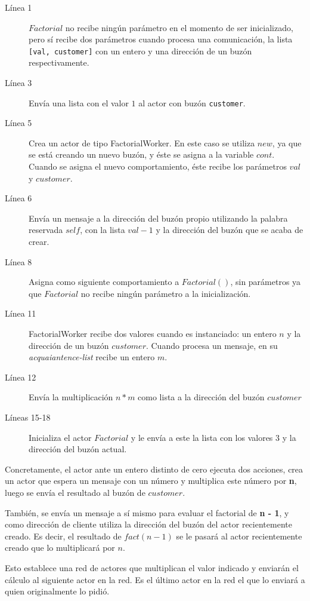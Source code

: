 \begin{description}

\item [Línea 1] $Factorial$ no recibe ningún parámetro en el momento de ser inicializado, pero sí recibe dos parámetros cuando procesa una comunicación, la lista \lstinline[language=sal, style=simple]$[val, customer]$ con un entero y una dirección de un buzón respectivamente.
\item [Línea 3] Envía una lista con el valor $1$ al actor con buzón \lstinline[language=sal, style=simple]$customer$.
\item [Línea 5] Crea un actor de tipo FactorialWorker. En este caso se utiliza $new$, ya que se está creando un nuevo buzón, y éste se asigna a la variable $cont$. Cuando se asigna el nuevo comportamiento, éste recibe los parámetros $val$ y $customer$.
\item [Línea 6] Envía un mensaje a la dirección del buzón propio utilizando la palabra reservada $self$, con la lista $val - 1$ y la dirección del buzón que se acaba de crear.
\item [Línea 8] Asigna como siguiente comportamiento a $Factorial()$, sin parámetros ya que $Factorial$ no recibe ningún parámetro a la inicialización.  
\item [Línea 11] FactorialWorker recibe dos valores cuando es instanciado: un entero $n$ y la dirección de un buzón $customer$. Cuando procesa un mensaje, en su \textit{acquaiantence-list} recibe un entero $m$.
\item [Línea 12] Envía la multiplicación $n*m$ como lista a la dirección del buzón $customer$ 
\item [Líneas 15-18] Inicializa el actor $Factorial$ y le envía a este la lista con los valores $3$ y la dirección del buzón actual. 

\end{description}

Concretamente, el actor ante un entero distinto de cero ejecuta dos acciones, crea un actor que espera un mensaje con un número y multiplica este número por \textbf{n}, luego se envía el resultado al buzón de $customer$.

También, se envía un mensaje a sí mismo para evaluar el factorial de \textbf{n - 1}, y como dirección de cliente utiliza la dirección del buzón del actor recientemente creado. Es decir, el resultado de $fact(n - 1)$ se le pasará al actor recientemente creado que lo multiplicará por $n$.

Esto establece una red de actores que multiplican el valor indicado y enviarán el cálculo al siguiente actor en la red. Es el último actor en la red el que lo enviará a quien originalmente lo pidió.

